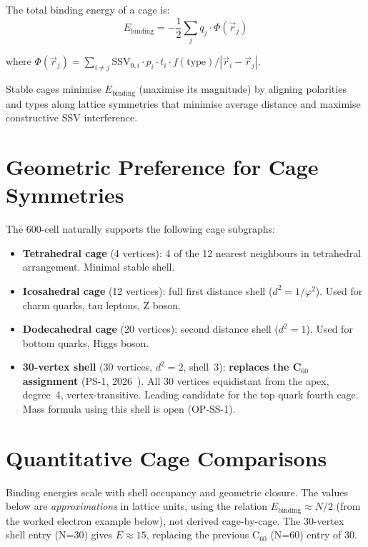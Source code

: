 \documentclass[11pt]{article}
\begin{document}
The total binding energy of a cage is:
\begin{equation}
E_{\text{binding}} = -\frac{1}{2} \sum_{j} q_j \cdot \Phi(\vec{r}_j)
\end{equation}

where $\Phi(\vec{r}_j) = \sum_{i \neq j}
\text{SSV}_{0,i} \cdot p_i \cdot t_i \cdot
f(\text{type}) / |\vec{r}_i - \vec{r}_j|$.

Stable cages minimise $E_{\text{binding}}$ (maximise its magnitude)
by aligning polarities and types along lattice symmetries that minimise
average distance and maximise constructive SSV interference.

\section{Geometric Preference for Cage Symmetries}

The 600-cell naturally supports the following cage subgraphs:

\begin{itemize}
\item \textbf{Tetrahedral cage} (4 vertices): 4 of the 12 nearest
  neighbours in tetrahedral arrangement.  Minimal stable shell.
\item \textbf{Icosahedral cage} (12 vertices): full first distance
  shell ($d^2 = 1/\varphi^2$).  Used for charm quarks, tau leptons, Z boson.
\item \textbf{Dodecahedral cage} (20 vertices): second distance shell
  ($d^2 = 1$).  Used for bottom quarks, Higgs boson.
\item \textbf{30-vertex shell} (30 vertices, $d^2 = 2$, shell~3):
  \textbf{replaces the C$_{60}$ assignment} (PS-1, 2026~\cite{ps1}).
  All 30 vertices equidistant from the apex, degree~4, vertex-transitive.
  Leading candidate for the top quark fourth cage.
  Mass formula using this shell is open (OP-SS-1).
\end{itemize}

\section{Quantitative Cage Comparisons}

Binding energies scale with shell occupancy and geometric closure.
The values below are \emph{approximations} in lattice units, using the
relation $E_{\text{binding}} \approx N/2$ (from the worked electron
example below), not derived cage-by-cage.  The 30-vertex shell entry
(N=30) gives $E \approx 15$, replacing the previous C$_{60}$ (N=60)
entry of 30.
\end{document}
